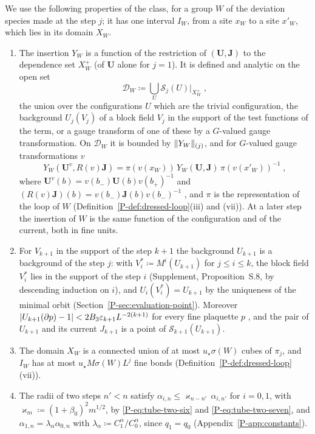 We use the following properties of the class, for a group $W$ of the deviation species made at the step $j$; it has one interval $I_W$, from a site $x_W$ to a site $x'_W$, which lies in its domain $X_W$.
\begin{enumerate}[label=(\alph*)]
\item The insertion $Y_W$ is a function of the restriction of $(\mathbf U, \mathbf J)$ to the dependence set $X^+_W$ (of $\mathbf U$ alone for $j = 1$). It is defined and analytic on the open set
\begin{equation}\label{eq:production-space}
    \mathcal D_W \coloneqq \bigcup_U\mathcal S_j(U)|_{X^+_W}\;,
\end{equation}
the union over the configurations $U$ which are the trivial configuration, the background $U_j(V_j)$ of a block field $V_j$ in the support of the test functions of the term, or a gauge transform of one of these by a $G$-valued gauge transformation. On $\mathcal D_W$ it is bounded by $\lVert Y_W\rVert_{(j)}$, and for $G$-valued gauge transformations $v$
\begin{equation}\label{eq:covariance-law}
    Y_W(\mathbf U^v, R(v)\mathbf J) = \pi(v(x_W))\,Y_W(\mathbf U, \mathbf J)\,\pi(v(x'_W))^{-1}\;,
\end{equation}
where $\mathbf U^v(b) = v(b_-)\mathbf U(b)v(b_+)^{-1}$ and $(R(v)\mathbf J)(b) = v(b_-)\mathbf J(b)v(b_-)^{-1}$ \cite[(1.10), p.~262]{BalabanRG1}, and $\pi$ is the representation of the loop of $W$ (Definition~\ref{P-def:dressed-loop}(iii) and (vii)). At a later step the insertion of $W$ is the same function of the configuration and of the current, both in fine units.
\item For $V_{k+1}$ in the support of the step $k + 1$ the background $U_{k+1}$ is a background of the step $j$: with $V^*_i \coloneqq M^i(U_{k+1})$ for $j \leq i \leq k$, the block field $V^*_i$ lies in the support of the step $i$ (Supplement, Proposition~S.8, by descending induction on $i$), and $U_i(V^*_i) = U_{k+1}$ by the uniqueness of the minimal orbit (Section~\ref{P-sec:evaluation-point}). Moreover $\lvert U_{k+1}(\partial p) - 1\rvert < 2B_3\varepsilon_{k+1}L^{-2(k+1)}$ for every fine plaquette $p$ \cite[p.~268]{BalabanCRE}, and the pair of $U_{k+1}$ and its current $J_{k+1}$ is a point of $\mathcal S_{k+1}(U_{k+1})$.
\item The domain $X_W$ is a connected union of at most $u_\star\sigma(W)$ cubes of $\pi_j$, and $I_W$ has at most $u_\star M\sigma(W)L^j$ fine bonds (Definition~\ref{P-def:dressed-loop}(vii)).
\item The radii of two steps $n' < n$ satisfy $\alpha_{i,n} \leq \varkappa_{n-n'}\,\alpha_{i,n'}$ for $i = 0, 1$, with $\varkappa_m \coloneqq (1 + \beta_0)^2m^{1/2}$, by \eqref{P-eq:tube-two-six} and \eqref{P-eq:tube-two-seven}, and $\alpha_{1,n} = \lambda_\alpha\alpha_{0,n}$ with $\lambda_\alpha \coloneqq C^\alpha_1/C^\alpha_0$, since $q_1 = q_0$ (Appendix~\ref{P-app:constants}).
\end{enumerate}
